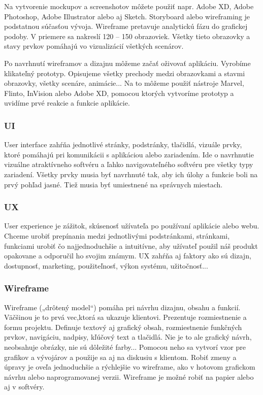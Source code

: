 \documentclass[10pt,twoside,slovak,a4paper]{article}
\begin{document}
Na vytvorenie mockupov a screenshotov môžete použiť napr. Adobe XD, Adobe Photoshop, Adobe Illustrator alebo aj Sketch. Storyboard alebo wireframing je podstatnou súčasťou vývoja. Wireframe pretavuje analytickú fázu do grafickej podoby. V priemere sa nakreslí 120 – 150 obrazoviek. Všetky tieto obrazovky a stavy prvkov pomáhajú vo vizualizácií všetkých scenárov.

Po navrhnutí wireframov a dizajnu môžeme začať oživovať aplikáciu. Vyrobíme klikateľný prototyp. Opisujeme všetky prechody medzi obrazovkami a stavmi obrazovky, všetky scenáre, animácie... Na to môžeme použiť nástroje Marvel, Flinto, InVision alebo Adobe XD, pomocou ktorých vytvoríme prototyp a uvidíme prvé reakcie a funkcie aplikácie.

\cite{EMM1, winpc}


\subsubsection{UI}
\quad User interface zahŕňa jednotlivé stránky, podstránky, tlačidlá, vizuále prvky, ktoré pomáhajú pri komunikácii s aplikáciou alebo zariadením. Ide o navrhnutie vizuálne atraktívneho softvéru a ľahko navigovateľného softvéru pre všetky typy zariadení. Všetky prvky musia byť navrhnuté tak, aby ich úlohy a funkcie boli na prvý pohľad jasné. Tiež musia byť umiestnené na správnych miestach.

\cite{touch4it}


\subsubsection{UX}
\quad User experience je zážitok, skúsenosť užívateľa po používaní aplikácie alebo webu. Chceme urobiť prepínania medzi jednotlivými podstránkami, stránkami, funkciami urobiť čo najjednoduchšie a intuitívne, aby užívateľ použil náš produkt opakovane a odporučil ho svojim známym. UX zahŕňa aj faktory ako sú dizajn, dostupnosť, marketing, použiteľnosť, výkon systému, užitočnosť...

\cite{touch4it, openxcell}


\subsubsection{Wireframe}
\quad Wireframe („drôtený model“) pomáha pri návrhu dizajnu, obsahu a funkcií. Väčšinou je to prvá vec,ktorá sa ukazuje klientovi. Prezentuje rozmiestnenie a formu projektu. Definuje textový aj grafický obsah, rozmiestnenie funkčných prvkov, navigáciu, nadpisy, kľúčový text a tlačidlá. Nie je to ale grafický návrh, neobsahuje obrázky, nie sú dôležité farby... Pomocou neho sa vytvorí vzor pre grafikov a vývojárov a použije sa aj na diskusiu s klientom. Robiť zmeny a úpravy je oveľa jednoduchšie a rýchlejšie vo wireframe, ako v hotovom grafickom návrhu alebo naprogramovanej verzii. Wireframe je možné robiť na papier alebo aj v softvéry.
\end{document}
